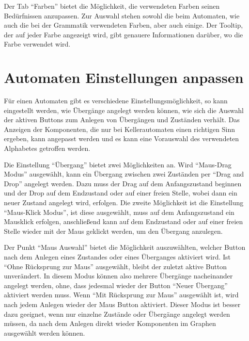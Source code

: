 Der Tab "`Farben"' bietet die Möglichkeit, die verwendeten Farben seinen
Be\-dürf\-nis\-sen anzupassen. Zur Auswahl stehen sowohl die beim Automaten, wie
auch die bei der Grammatik verwendeten Farben, aber auch einige. Der Tooltip,
der auf jeder Farbe angezeigt wird, gibt genauere Informationen darüber, wo
die Farbe verwendet wird.


\section{Automaten Einstellungen anpassen}

Für einen Automaten gibt es verschiedene Einstellungsmöglichkeit, so kann
eingestellt werden, wie Übergänge angelegt werden können, wie sich die
Auswahl der aktiven Buttons zum Anlegen von Übergängen und Zuständen verhält.
Das Anzeigen der Komponenten, die nur bei Kellerautomaten einen richtigen Sinn
ergeben, kann angepasst werden und es kann eine Vorauswahl des verwendeten
Alphabetes getroffen werden.\vspace{10pt}

Die Einstellung "`Übergang"' bietet zwei Möglichkeiten an. Wird "`Maus-Drag Modus"'
ausgewählt, kann ein Übergang zwischen zwei Zuständen per "`Drag and Drop"' angelegt
werden. Dazu muss der Drag auf dem Anfangszustand beginnen und der Drop auf dem
Endzustand oder auf einer freien Stelle, wobei dann ein neuer Zustand angelegt wird,
erfolgen. Die zweite Möglichkeit ist die Einstellung "`Maus-Klick Modus"', ist diese
ausgewählt, muss auf dem Anfangszustand ein Mausklick erfolgen, anschließend kann auf
dem Endzustand oder auf einer freien Stelle wieder mit der Maus geklickt werden,
um den Übergang anzulegen.\vspace{10pt}

Der Punkt "`Maus Auswahl"' bietet die Möglichkeit auszuwählten, welcher Button nach
dem Anlegen eines Zustandes oder eines Überganges aktiviert wird. Ist "`Ohne
Rücksprung zur Maus"' ausgewählt, bleibt der zuletzt aktive Button unverändert.
In diesem Modus können also mehrere Übergänge nacheinander angelegt werden, ohne,
dass jedesmal wieder der Button "`Neuer Übergang"' aktiviert werden muss. Wenn
"`Mit Rücksprung zur Maus"' ausgewählt ist, wird nach jedem Anlegen wieder der
Maus Button aktiviert. Dieser Modus ist besser dazu geeignet, wenn nur einzelne
Zustände oder Übergänge angelegt werden müssen, da nach dem Anlegen direkt wieder
Komponenten im Graphen ausgewählt werden können.\vspace{10pt}

